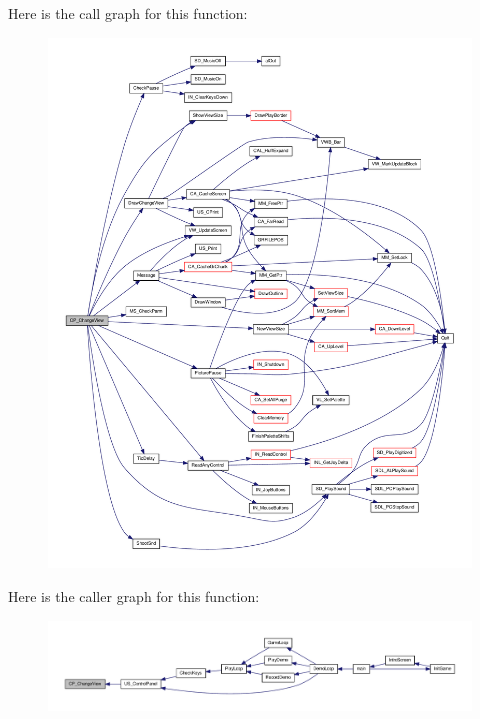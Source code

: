 Here is the call graph for this function:
\nopagebreak
\begin{figure}[H]
\begin{center}
\leavevmode
\includegraphics[width=400pt]{WL__MENU_8C_a95a4685a2d017477e6a863344b787642_cgraph}
\end{center}
\end{figure}




Here is the caller graph for this function:
\nopagebreak
\begin{figure}[H]
\begin{center}
\leavevmode
\includegraphics[width=400pt]{WL__MENU_8C_a95a4685a2d017477e6a863344b787642_icgraph}
\end{center}
\end{figure}


